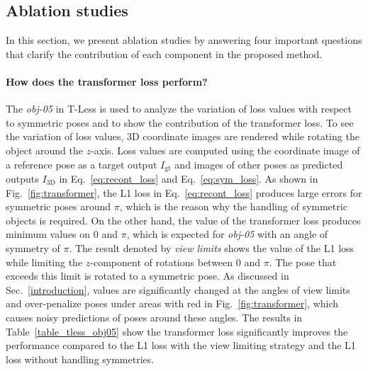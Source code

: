 \documentclass[10pt,twocolumn,letterpaper]{article}
\begin{document}
\subsection{Ablation studies} \label{ablation}
In this section, we present ablation studies by answering four important questions that clarify the contribution of each component in the proposed method.




\paragraph{How does the transformer loss perform?} \label{ablation:transform}
The \textit{obj-05} in T-Less is used to analyze the variation of loss values with respect to symmetric poses and to show the contribution of the transformer loss. To see the variation of loss values, 3D coordinate images are rendered while rotating the object around the $z$-axis. Loss values are computed using the coordinate image of a reference pose as a target output $I_\textrm{gt}$ and images of other poses as predicted outputs $I_\textrm{3D}$ in Eq.~\ref{eq:recont_loss} and Eq.~\ref{eq:sym_loss}. As shown in Fig.~\ref{fig:transformer}, the L1 loss in Eq.~\ref{eq:recont_loss} produces large errors for symmetric poses around $\pi$, which is the reason why the handling of symmetric objects is required. On the other hand, the value of the transformer loss produces minimum values on $0$ and $\pi$, which is expected for \textit{obj-05} with an angle of symmetry of $\pi$. The result denoted by \textit{view limits} shows the value of the L1 loss while limiting the $z$-component of rotations between $0$ and $\pi$. The pose that exceeds this limit is rotated to a symmetric pose. As discussed in Sec.~\ref{introduction}, values are significantly changed at the angles of view limits and over-penalize poses under areas with red in Fig.~\ref{fig:transformer}, which causes noisy predictions of poses around these angles. The results in Table~\ref{table_tless_obj05} show the transformer loss significantly improves the performance compared to the L1 loss with the view limiting strategy and the L1 loss without handling symmetries. 
\end{document}
